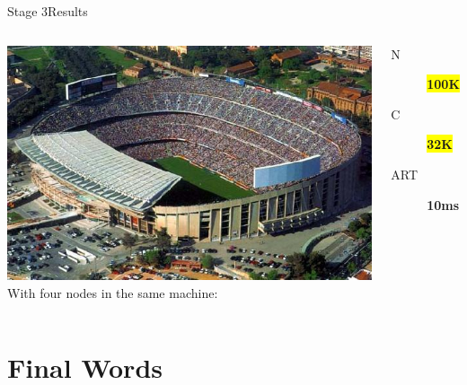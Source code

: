 \documentclass[utf8]{beamer}
\begin{document}
\begin{frame}{Stage 3}{Results}
	\begin{columns}
			\includegraphics[top=-1,width=\textwidth]{img/results-4.jpg}
			With four nodes in the same machine:
			\begin{description}
				\item[N] \textbf{\colorbox{yellow}{\Large 100K}}
				\item[C] \textbf{\colorbox{yellow}{\Large 32K}}
				\item[ART] \textbf{\Large 10ms}
			\end{description}
	\end{columns}
\end{frame}

\section{Final Words}
\end{document}
